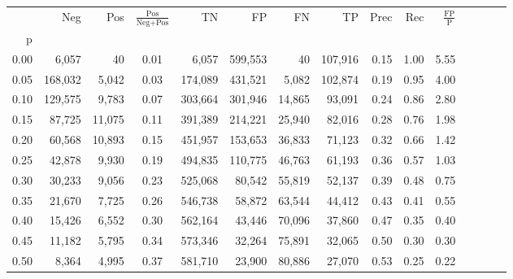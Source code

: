 \begin{tabular}{rrrcrrrrrrrrrrr}
\toprule
{} &      Neg &     Pos & $\frac{\text{Pos}}{\text{Neg}+\text{Pos}}$ &       TN &       FP &       FN &       TP &  Prec &   Rec & $\frac{\text{FP}}{\text{P}}$ \\
p    &          &         &                                            &          &          &          &          &       &       &                              \\
\midrule
0.00 &    6,057 &      40 &                                       0.01 &    6,057 &  599,553 &       40 &  107,916 &  0.15 &  1.00 &                         5.55 \\
0.05 &  168,032 &   5,042 &                                       0.03 &  174,089 &  431,521 &    5,082 &  102,874 &  0.19 &  0.95 &                         4.00 \\
0.10 &  129,575 &   9,783 &                                       0.07 &  303,664 &  301,946 &   14,865 &   93,091 &  0.24 &  0.86 &                         2.80 \\
0.15 &   87,725 &  11,075 &                                       0.11 &  391,389 &  214,221 &   25,940 &   82,016 &  0.28 &  0.76 &                         1.98 \\
0.20 &   60,568 &  10,893 &                                       0.15 &  451,957 &  153,653 &   36,833 &   71,123 &  0.32 &  0.66 &                         1.42 \\
0.25 &   42,878 &   9,930 &                                       0.19 &  494,835 &  110,775 &   46,763 &   61,193 &  0.36 &  0.57 &                         1.03 \\
0.30 &   30,233 &   9,056 &                                       0.23 &  525,068 &   80,542 &   55,819 &   52,137 &  0.39 &  0.48 &                         0.75 \\
0.35 &   21,670 &   7,725 &                                       0.26 &  546,738 &   58,872 &   63,544 &   44,412 &  0.43 &  0.41 &                         0.55 \\
0.40 &   15,426 &   6,552 &                                       0.30 &  562,164 &   43,446 &   70,096 &   37,860 &  0.47 &  0.35 &                         0.40 \\
0.45 &   11,182 &   5,795 &                                       0.34 &  573,346 &   32,264 &   75,891 &   32,065 &  0.50 &  0.30 &                         0.30 \\
0.50 &    8,364 &   4,995 &                                       0.37 &  581,710 &   23,900 &   80,886 &   27,070 &  0.53 &  0.25 &                         0.22 \\

\end{tabular}
